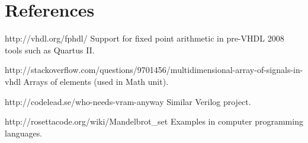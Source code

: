 \documentclass[titlepage]{article}      %
\begin{document}
\section{References}
http://vhdl.org/fphdl/ Support for fixed point arithmetic in pre-VHDL 2008 tools such as Quartus II.

http://stackoverflow.com/questions/9701456/multidimensional-array-of-signals-in-vhdl Arrays of elements (used in Math unit).

http://codelead.se/who-needs-vram-anyway Similar Verilog project.

http://rosettacode.org/wiki/Mandelbrot\_set Examples in computer programming languages.
\end{document}
